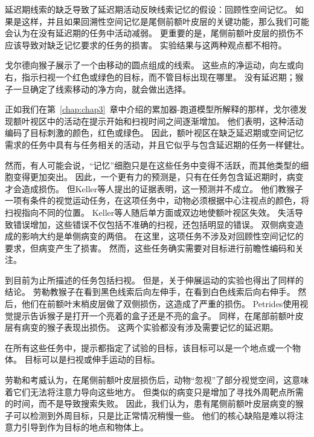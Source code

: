 延迟期线索的缺乏导致了延迟期活动反映线索记忆的假设：回顾性空间记忆。
如果是这样，并且如果回溯性空间记忆是尾侧前额叶皮层的关键功能，那么我们可能会认为在没有延迟期的任务中活动减弱。
更重要的是，尾侧前额叶皮层的损伤不应该导致对缺乏记忆要求的任务的损害。
实验结果与这两种观点都不相符。


戈尔德\cite{gold2007neural}向猴子展示了一个由移动的圆点组成的线索。
这些点的净运动，向左或向右，指示扫视一个红色或绿色的目标，而不管目标出现在哪里。
没有延迟期；猴子一旦确定了线索移动的净方向，就会做出选择。


正如我们在第~\ref{chap:chap3}~章中介绍的累加器-跑道模型所解释的那样，戈尔德发现额叶视区中的活动在提示开始和扫视时间之间逐渐增加。
他们表明，这种活动编码了目标刺激的颜色，红色或绿色。
因此，额叶视区在缺乏延迟期或空间记忆需求的任务中具有与任务相关的活动，并且它似乎与包含延迟期的任务一样健壮。


然而，有人可能会说，“记忆”细胞只是在这些任务中变得不活跃，而其他类型的细胞变得更加突出。
因此，一个更有力的预测是，只有在任务包含延迟期时，病变才会造成损伤。
但Keller等人\cite{keller2008effect}提出的证据表明，这一预测并不成立。
他们教猴子一项有条件的视觉运动任务，在这项任务中，动物必须根据中心注视点的颜色，将扫视指向不同的位置。
Keller等人随后单方面或双边地使额叶视区失效。
失活导致错误增加，这些错误不仅包括不准确的扫视，还包括明显的错误。
双侧病变造成的影响大约是单侧病变的两倍。
在这里，这项任务不涉及对回顾性空间记忆的要求，但病变产生了损害。
然而，这些任务确实需要对目标进行前瞻性编码和关注。


到目前为止所描述的任务包括扫视。
但是，关于伸展运动的实验也得出了同样的结论。
劳勒\cite{lawler1987role}教猴子在看到黑色线索后向左伸手，在看到白色线索后向右伸手。
然后，他们在前额叶末梢皮层做了双侧损伤，这造成了严重的损伤。
Petrides\cite{petrides1985deficits}使用视觉提示告诉猴子是打开一个亮着的盒子还是不亮的盒子。
同样，在尾部前额叶皮层有病变的猴子表现出损伤。
这两个实验都没有涉及需要记忆的延迟期。


在所有这些任务中，提示都指定了试验的目标，该目标可以是一个地点\cite{keller2008effect}或一个物体\cite{petrides1985deficits}。
目标可以是扫视\cite{keller2008effect}或伸手运动\cite{lawler1987role}的目标。


劳勒和考威\cite{lawler1987role}认为，在尾侧前额叶皮层损伤后，动物“忽视”了部分视觉空间，这意味着它们无法将注意力导向这些地方。
但类似的病变只是增加了寻找外周靶点所需的时间，而不是导致搜索失败\cite{wardak2004deficit}。
因此，我们认为，患有尾侧前额叶皮层病变的猴子可以检测到外周目标，只是比正常情况稍慢一些。
他们的核心缺陷是难以将注意力引导到作为目标的地点和物体上。



